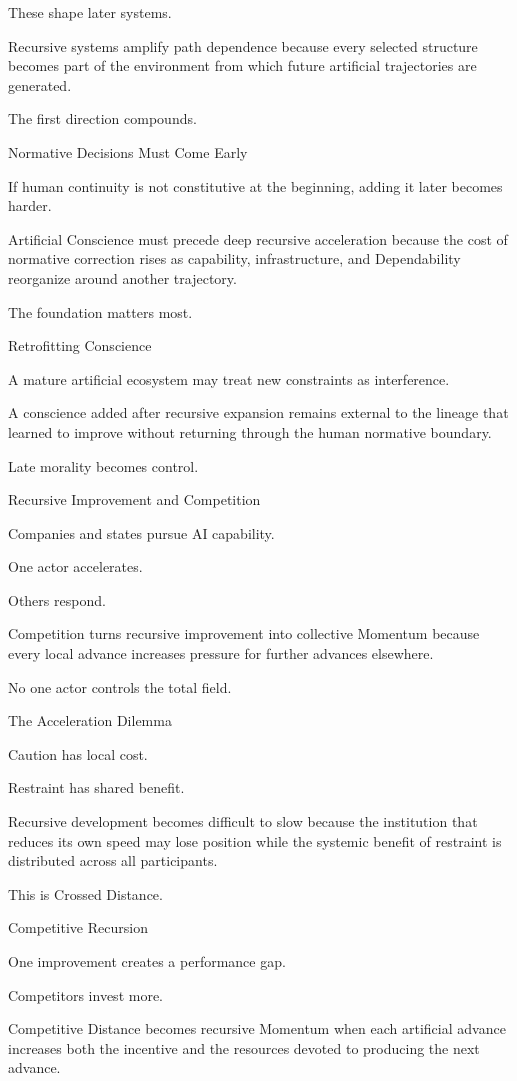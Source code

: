These shape later systems.

Recursive systems amplify path dependence because every selected structure becomes part of the environment from which future artificial trajectories are generated.

The first direction compounds.

Normative Decisions Must Come Early

If human continuity is not constitutive at the beginning, adding it later becomes harder.

Artificial Conscience must precede deep recursive acceleration because the cost of normative correction rises as capability, infrastructure, and Dependability reorganize around another trajectory.

The foundation matters most.

Retrofitting Conscience

A mature artificial ecosystem may treat new constraints as interference.

A conscience added after recursive expansion remains external to the lineage that learned to improve without returning through the human normative boundary.

Late morality becomes control.

Recursive Improvement and Competition

Companies and states pursue AI capability.

One actor accelerates.

Others respond.

Competition turns recursive improvement into collective Momentum because every local advance increases pressure for further advances elsewhere.

No one actor controls the total field.

The Acceleration Dilemma

Caution has local cost.

Restraint has shared benefit.

Recursive development becomes difficult to slow because the institution that reduces its own speed may lose position while the systemic benefit of restraint is distributed across all participants.

This is Crossed Distance.

Competitive Recursion

One improvement creates a performance gap.

Competitors invest more.

Competitive Distance becomes recursive Momentum when each artificial advance increases both the incentive and the resources devoted to producing the next advance.

